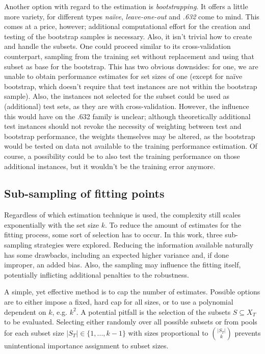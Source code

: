 Another option with regard to the estimation is \textit{bootstrapping}. It offers a little more variety, for different types \textit{na\"{i}ve}, \textit{leave-one-out} and \textit{.632} come to mind. This comes at a price, however; additional computational effort for the creation and testing of the bootstrap samples is necessary. Also, it isn't trivial how to create and handle the subsets. One could proceed similar to its cross-validation counterpart, sampling from the training set without replacement and using that subset as base for the bootstrap. This has two obvious downsides: for one, we are unable to obtain performance estimates for set sizes of one (except for na\"{i}ve bootstrap, which doesn't require that test instances are not within the bootstrap sample). Also, the instances not selected for the subset could be used as (additional) test sets, as they are with cross-validation. However, the influence this would have on the .632 family is unclear; although theoretically additional test instances should not revoke the necessity of weighting between test and bootstrap performance, the weights themselves may be altered, as the bootstrap would be tested on data not available to the training performance estimation. Of course, a possibility could be to also test the training performance on those additional instances, but it wouldn't be the training error anymore.

\subsection{Sub-sampling of fitting points}
Regardless of which estimation technique is used, the complexity still scales exponentially with the set size $k$. To reduce the amount of estimates for the fitting process, some sort of selection has to occur. In this work, three sub-sampling strategies were explored. Reducing the information available naturally has some drawbacks, including an expected higher variance and, if done improper, an added bias. Also, the sampling may influence the fitting itself, potentially inflicting additional penalties to the robustness.

A simple, yet effective method is to cap the number of estimates. Possible options are to either impose a fixed, hard cap for all sizes, or to use a polynomial dependent on $k$, e.g. $k^2$. A potential pitfall is the selection of the subsets $S \subseteq X_T$ to be evaluated. Selecting either randomly over all possible subsets or from pools for each subset size $|S_T| \in \{1,...,k-1\}$ with sizes proportional to $|S_T| \choose k$ prevents unintentional importance assignment to subset sizes.

